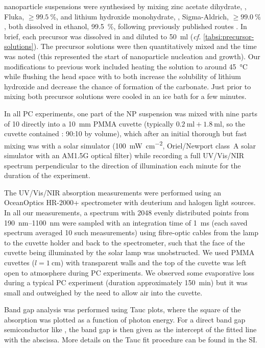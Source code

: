 \documentclass[9pt,twoside,twocolumn]{article}\usepackage{knitr}
\begin{document}
\begin{refsection}
 nanoparticle suspensions were synthesised by mixing zinc acetate dihydrate, , Fluka, $\geqslant\qty{99.5}{\percent}$, and lithium hydroxide monohydrate, , Sigma-Aldrich, $\geqslant\qty{99.0}{\percent}$, both dissolved in ethanol, \qty{99.5}{\percent}, following previously published routes \cite{Jacobsson2011,Meulenkamp1998,Spanhel1991}.
In brief, each precursor was dissolved in  and diluted to \qty{50}{\ml} (\textit{cf.} \cref{tabsi:precursor-solutions}). 
The precursor solutions were then quantitatively mixed and the time was noted (this represented the start of nanoparticle nucleation and growth).
Our modifications to previous work included heating the  solution to around \qty{45}{\celsius} while flushing the head space with  to both increase the solubility of lithium hydroxide and decrease the chance of formation of the carbonate. 
Just prior to mixing both precursor solutions were cooled in an ice bath for a few minutes.

In all PC experiments, one part of the  NP suspension was mixed with nine parts of \qty{10}{\micromolar}  directly into a \qty{10}{\mm} PMMA cuvette (typically $\qty{0.2}{\ml}+\qty{1.8}{\ml}$, so the cuvette contained : 90:10 by volume), which after an initial thorough but fast mixing was with a solar simulator (\qty{100}{\mW\per\square\cm}, Oriel/Newport class~A solar simulator with an AM1.5G optical filter) while recording a full UV/Vis/NIR spectrum perpendicular to the direction of illumination each minute for the duration of the experiment.


The UV/Vis/NIR absorption measurements were performed using an OceanOptics HR-2000+ spectrometer with deuterium and halogen light sources.
In all our measurements, a spectrum with \num{2048} evenly distributed points from \qtyrange{190}{1100}{\nm} were sampled with an integration time of \qty{1}{\ms} (each saved spectrum averaged \num{10} such measurements) using fibre-optic cables from the lamp to the cuvette holder and back to the spectrometer, such that the face of the cuvette being illuminated by the solar lamp was unobstructed. 
We used PMMA cuvettes ($l=\qty{1}{\cm}$) with transparent walls and the top of the cuvette was left open to atmosphere during PC experiments. We observed some evaporative loss during a typical PC experiment (duration approximately \qty{150}{\minute}) but it was small and outweighed by the need to allow air into the cuvette.

Band gap analysis was performed using Tauc plots, where the square of the absorption was plotted as a function of photon energy. 
For a direct band gap semiconductor like , the band gap is then given as the intercept of the fitted line with the abscissa. More details on the Tauc fit procedure can be found in the SI.


\end{refsection}
\end{document}
